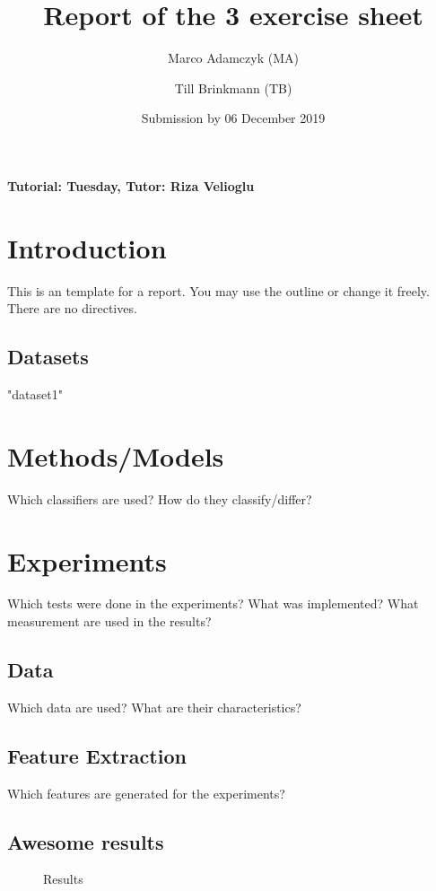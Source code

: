 \documentclass[a4paper,12pt]{article}
\title{Report of the 3\ts{rd} exercise sheet}
\author{Marco Adamczyk (MA) \and Till Brinkmann (TB)}
\date{Submission by 06\ts{th} December 2019}
\newcommand{\initials}[1]{\marginpar{\quad\texttt{#1}}}
\begin{document}

\pagestyle{myheadings}
    
\maketitle

\begin{center}
    \textbf{Tutorial: Tuesday, Tutor: Riza Velioglu}
\end{center}

\section{Introduction}
This is an template for a report. You may use the outline or change it freely. There are no directives.
\subsection{Datasets}
"dataset1"


\section{Methods/Models}
Which classifiers are used? How do they classify/differ?
\initials{FGM}

\section{Experiments}
Which tests were done in the experiments? What was implemented? What measurement are used in the results?
\subsection{Data}
Which data are used? What are their characteristics?
\initials{SGM}

\subsection{Feature Extraction}
Which features are generated for the experiments?
\initials{TGM}

\subsection{Awesome results}

\begin{figure}[h]
\centering
\caption{Results}
\label{fig_res}
\end{figure}
\end{document}
